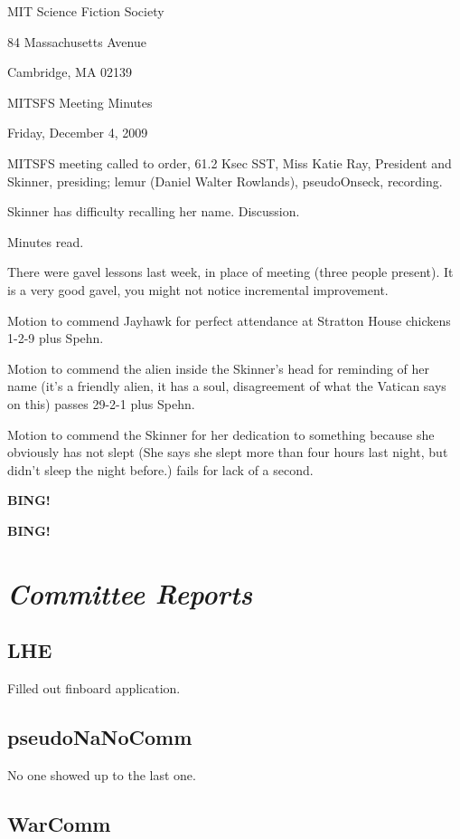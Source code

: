 \documentclass[10pt]{article}
\newcommand{\bing}{{\bf BING!} }
\newcommand{\goto}[1]{\bing \vskip 12pt \section*{{\em{#1}}}}
\newcommand{\ps}{ plus Spehn\xspace}
\newcommand{\skinner}{Miss Katie Ray, President and Skinner}
\newcommand{\onseck}{lemur (Daniel Walter Rowlands), pseudoOnseck}
\newcommand{\meetingdate}{Friday, December 4, 2009}
\begin{document}
\begin{center}

MIT Science Fiction Society

84 Massachusetts Avenue

Cambridge, MA 02139

\vspace{12pt}

MITSFS Meeting Minutes

\meetingdate

\end{center}

\vspace{18pt}

\setlength{\parskip}{6pt}

\noindent
MITSFS meeting called to order, 61.2 Ksec SST,
\skinner, presiding; \onseck, recording.

Skinner has difficulty recalling her name.  Discussion.

Minutes read.

There were gavel lessons last week, in place of meeting (three people present).  It is a very good gavel, you might not notice incremental improvement.

Motion to commend Jayhawk for perfect attendance at Stratton House chickens 1-2-9\ps.

Motion to commend the alien inside the Skinner's head for reminding of her name (it's a friendly alien, it has a soul, disagreement of what the Vatican says on this) passes 29-2-1\ps.

Motion to commend the Skinner for her dedication to something because she obviously has not slept (She says she slept more than four hours last night, but didn't sleep the night before.) fails for lack of a second.

\bing

\goto{Committee Reports}

\subsection*{LHE}

Filled out finboard application.

\subsection*{pseudoNaNoComm}

No one showed up to the last one.

\subsection*{WarComm}
\end{document}
